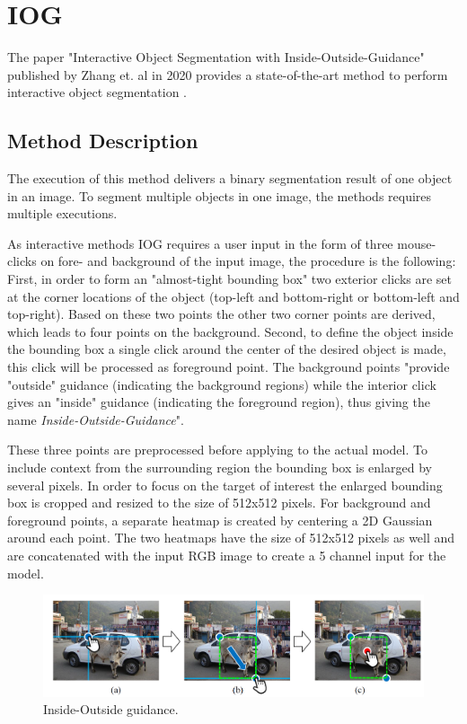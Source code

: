 
\section{IOG}\label{ord:ch3:sec1}

The paper "Interactive Object Segmentation with Inside-Outside-Guidance" published by Zhang et. al in 2020 provides a state-of-the-art method to perform interactive object segmentation \cite{Zha2020}.

\subsection{Method Description}\label{ord:ch3:sec1:subsec1}
The execution of this method delivers a binary segmentation result of one object in an image. 
To segment multiple objects in one image, the methods requires multiple executions.

As interactive methods IOG requires a user input in the form of three mouse-clicks on fore- and background of the input image, the procedure is the following: 
First, in order to form an "almost-tight bounding box"\cite{Zha2020} two exterior clicks are set at the corner locations of the object (top-left and bottom-right or bottom-left and top-right).
Based on these two points the other two corner points are derived, which leads to four points on the background. 
Second, to define the object inside the bounding box a single click around the center of the desired object is made, this click will be processed as foreground point. 
The background points "provide "outside" guidance (indicating the background regions) while the interior click gives an "inside" guidance (indicating the foreground region), thus giving the name \textit{Inside-Outside-Guidance}"\cite{Zha2020}.

These three points are preprocessed before applying to the actual model. To include context from the surrounding region the bounding box is enlarged by several pixels. 
In order to focus on the target of interest the enlarged bounding box is cropped and resized to the size of 512x512 pixels. 
For background and foreground points, a separate heatmap is created by centering a 2D Gaussian around each point. 
The two heatmaps have the size of 512x512 pixels as well and are concatenated with the input RGB image to create a 5 channel input for the model. 

\begin{figure}
	\includegraphics[width=\linewidth]{figures/chap31_clicks.png}
	\caption{Inside-Outside guidance.}
	\label{fig:ch3:sec1:iog}
\end{figure}

